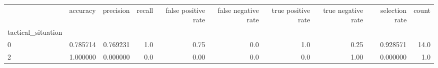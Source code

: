\begin{tabular}{lrrrrrrrrr}
\toprule
{} &  accuracy &  precision &  recall &  false positive rate &  false negative rate &  true positive rate &  true negative rate &  selection rate &  count \\
tactical\_situation &           &            &         &                      &                      &                     &                     &                 &        \\
\midrule
0                  &  0.785714 &   0.769231 &     1.0 &                 0.75 &                  0.0 &                 1.0 &                0.25 &        0.928571 &   14.0 \\
2                  &  1.000000 &   0.000000 &     0.0 &                 0.00 &                  0.0 &                 0.0 &                1.00 &        0.000000 &    1.0 \\
\bottomrule
\end{tabular}
